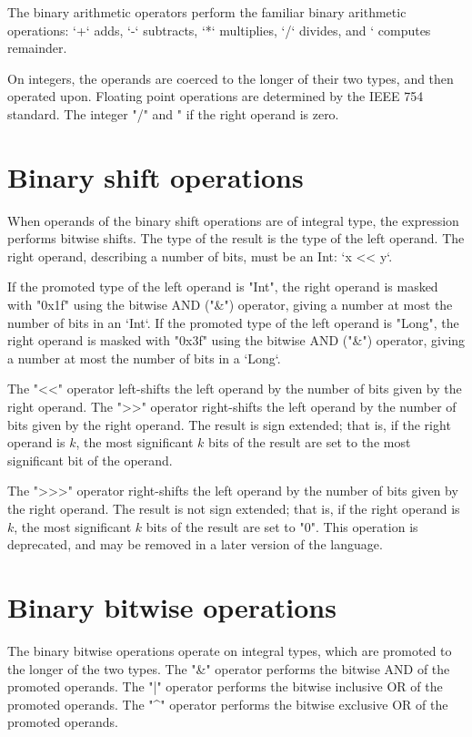 The binary arithmetic operators perform the familiar binary arithmetic
operations: \xcd`+` adds, \xcd`-` subtracts, \xcd`*` multiplies, 
\xcd`/` divides, and \xcd`%
computes remainder.

On integers, the operands are coerced to the longer of their two types, and
then operated upon.  
Floating point operations are determined by the IEEE 754
standard. 
The integer \xcd"/" and \xcd"%
if the right operand is zero.



\section{Binary shift operations}

When operands of the binary shift operations are of integral type, the
expression performs bitwise shifts. 
The type of the result is the type of the left operand.
The right operand, describing a number of bits, must be an Int: 
\xcd`x << y`.


If the promoted type of the left operand is \xcd"Int",
the right operand is masked with \xcd"0x1f" using the bitwise
AND (\xcd"&") operator, giving a number at most the number of bits in an
\xcd`Int`. 
If the promoted type of the left operand is \xcd"Long",
the right operand is masked with \xcd"0x3f" using the bitwise
AND (\xcd"&") operator, giving a number at most the number of bits in a
\xcd`Long`. 

The \xcd"<<" operator left-shifts the left operand by the number of
bits given by the right operand.
The \xcd">>" operator right-shifts the left operand by the number of
bits given by the right operand.  The result is sign extended;
that is, if the right operand is $k$,
the most significant $k$ bits of the result are set to the most
significant bit of the operand.

The \xcd">>>" operator right-shifts the left operand by the number of
bits given by the right operand.  The result is not sign extended;
that is, if the right operand is $k$,
the most significant $k$ bits of the result are set to \xcd"0".
This operation is deprecated, and may be removed in a later version of the
language. 


\section{Binary bitwise operations}

The binary bitwise operations operate on integral types, which are promoted to
the longer of the two types.
The \xcd"&" operator  performs the bitwise AND of the promoted operands.
The \xcd"|" operator  performs the bitwise inclusive OR of the promoted operands.
The \xcd"^" operator  performs the bitwise exclusive OR of the promoted operands.

